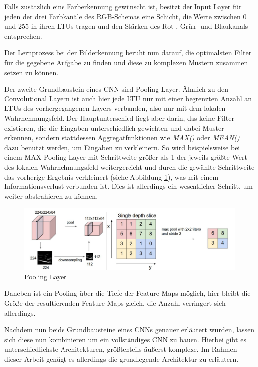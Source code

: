 Falls zusätzlich eine Farberkennung gewünscht ist, besitzt der Input Layer für jeden der drei Farbkanäle des RGB-Schemas eine Schicht, die Werte zwischen 0 und 255 in ihren LTUs tragen und den Stärken des Rot-, Grün- und Blaukanals entsprechen. \cite{AurelienGeron.2018}

Der Lernprozess bei der Bilderkennung beruht nun darauf, die optimalsten Filter für die gegebene Aufgabe zu finden und diese zu komplexen Mustern zusammen setzen zu können. \cite{AurelienGeron.2018}

Der zweite Grundbaustein eines CNN sind Pooling Layer. Ähnlich zu den Convolutional Layern ist auch hier jede LTU nur mit einer begrenzten Anzahl an LTUs des vorhergegangenen Layers verbunden, also nur mit dem lokalen Wahrnehmungsfeld. Der Hauptunterschied liegt aber darin, das keine Filter existieren, die die Eingaben unterschiedlich gewichten und dabei Muster erkennen, sondern stattdessen Aggregatfunktionen wie \textit{MAX()} oder \textit{MEAN()} dazu benutzt werden, um Eingaben zu verkleinern. So wird beispielsweise bei einem MAX-Pooling Layer mit Schrittweite größer als 1 der jeweils größte Wert des lokalen Wahrnehmungsfeld weitergereicht und durch die gewählte Schrittweite das vorherige Ergebnis verkleinert (siehe Abbildung \ref{pooling_layer}), was mit einem Informationsverlust verbunden ist. Dies ist allerdings ein wesentlicher Schritt, um weiter abstrahieren zu können. \cite{AurelienGeron.2018}

\begin{figure}[ht]
	\begin{center}
		\includegraphics[width=15cm]{Bilder/pooling_layer.png} 
		\caption[Pooling Layer]{Pooling Layer \cite{LeonadroAraujoSantos.2018}}
		\label{pooling_layer}
	\end{center}
\end{figure}

Daneben ist ein Pooling über die Tiefe der Feature Maps möglich, hier bleibt die Größe der resultierenden Feature Maps gleich, die Anzahl verringert sich allerdings. \cite{AurelienGeron.2018}

Nachdem nun beide Grundbausteine eines CNNs genauer erläutert wurden, lassen sich diese nun kombinieren um ein vollständiges CNN zu bauen. Hierbei gibt es unterschiedlichste Architekturen, größtenteils äußerst komplexe. Im Rahmen dieser Arbeit genügt es allerdings die grundlegende Architektur zu erläutern.

